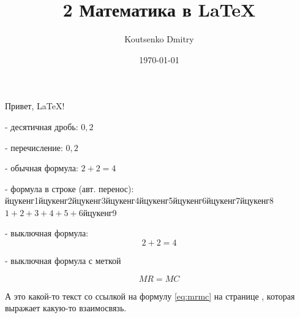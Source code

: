 \documentclass[a4paper,12pt]{article}                       %
\title{2 Математика в \LaTeX{}}
\author{Koutsenko Dmitry}
\date{\today}
\begin{document}

\maketitle

Привет, \LaTeX{}!

- десятичная дробь: $0,2$

- перечисление: $0, 2$

- обычная формула: $2 + 2 = 4$

- формула в строке (авт. перенос): йцукенг1йцукенг2йцукенг3йцукенг4йцукенг5йцукенг6йцукенг7йцукенг8$1+2+3+4+5+6$йцукенг9

- выключная формула: \[2 + 2 = 4\]

- выключная формула с меткой

\begin{equation}\label{eq:mrmc}
    MR=MC
\end{equation}

А это какой-то текст со ссылкой на формулу \eqref{eq:mrmc} на странице \pageref{eq:mrmc}, которая выражает какую-то взаимосвязь.
\end{document}
